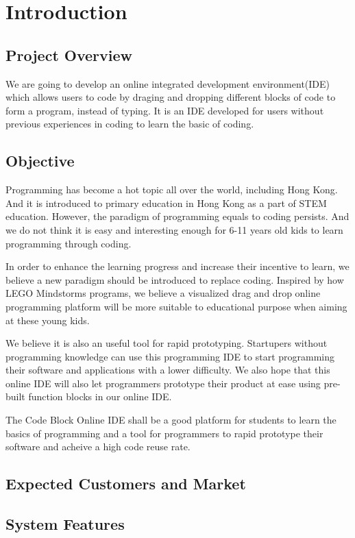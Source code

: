 \documentclass[CSCI3100_Documentation]{subfiles}
\begin{document}
  \chapter{Introduction}
  \section{Project Overview}
  We are going to develop an online integrated development environment(IDE) which allows users to code by draging and dropping different blocks of code to form a program, instead of typing. It is an IDE developed for users without previous experiences in coding to learn the basic of coding.
  \section{Objective}
  Programming has become a hot topic all over the world, including Hong Kong. And it is introduced to primary education in Hong Kong as a part of STEM education. However, the paradigm of programming equals to coding persists. And we do not think it is easy and interesting enough for 6-11 years old kids to learn programming through coding.

  In order to enhance the learning progress and increase their incentive to learn, we believe a new paradigm should be introduced to replace coding. Inspired by how LEGO\textsuperscript{\textregistered} Mindstorms\textsuperscript{\textregistered} programs, we believe a visualized drag and drop online programming platform will be more suitable to educational purpose when aiming at these young kids.

  We believe it is also an useful tool for rapid prototyping. Startupers without programming knowledge can use this programming IDE to start programming their software and applications with a lower difficulty. We also hope that this online IDE will also let programmers prototype their product at ease using pre-built function blocks in our online IDE.

  The Code Block Online IDE shall be a good platform for students to learn the basics of programming and a tool for programmers to rapid prototype their software and acheive a high code reuse rate.
  \section{Expected Customers and Market}
  \section{System Features}
\end{document}
